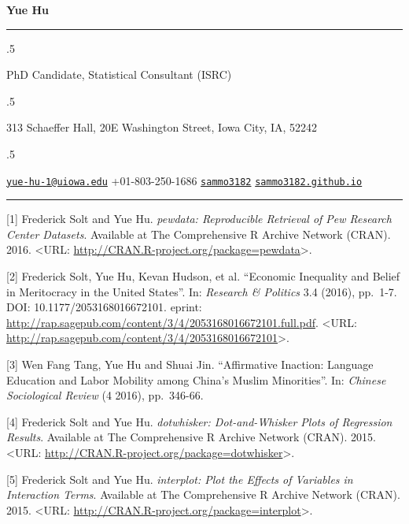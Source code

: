 \documentclass[10.5pt,]{article}
\begin{document}
\centerline{\huge \bf Yue Hu}

\vspace{2 mm}

\hrule

\vspace{2 mm}

\moveleft.5\hoffset\centerline{PhD Candidate, Statistical Consultant (ISRC)}
\moveleft.5\hoffset\centerline{313 Schaeffer Hall, 20E Washington Street, Iowa City, IA, 52242}
\moveleft.5\hoffset\centerline{ \faEnvelopeO \hspace{1 mm} \href{mailto:}{\tt \href{mailto:yue-hu-1@uiowa.edu}{\nolinkurl{yue-hu-1@uiowa.edu}}} \hspace{1 mm}  \faPhone \hspace{1 mm}  +01-803-250-1686  \hspace{1 mm}  \faGithub \hspace{1 mm} \href{http://github.com/sammo3182}{\tt sammo3182} \hspace{1 mm}    \faGlobe \hspace{1 mm} \href{http://sammo3182.github.io}{\tt sammo3182.github.io}   }

\vspace{2 mm}

\hrule


{[}1{]} Frederick Solt and Yue Hu. \emph{pewdata: Reproducible Retrieval
of Pew Research Center Datasets}. Available at The Comprehensive R
Archive Network (CRAN). 2016. \textless{}URL:
\url{http://CRAN.R-project.org/package=pewdata}\textgreater{}.

{[}2{]} Frederick Solt, Yue Hu, Kevan Hudson, et al. ``Economic
Inequality and Belief in Meritocracy in the United States''. In:
\emph{Research \& Politics} 3.4 (2016), pp.~1-7. DOI:
10.1177/2053168016672101. eprint:
\url{http://rap.sagepub.com/content/3/4/2053168016672101.full.pdf}.
\textless{}URL:
\url{http://rap.sagepub.com/content/3/4/2053168016672101}\textgreater{}.

{[}3{]} Wen Fang Tang, Yue Hu and Shuai Jin. ``Affirmative Inaction:
Language Education and Labor Mobility among China's Muslim Minorities''.
In: \emph{Chinese Sociological Review} (4 2016), pp.~346-66.

{[}4{]} Frederick Solt and Yue Hu. \emph{dotwhisker: Dot-and-Whisker
Plots of Regression Results}. Available at The Comprehensive R Archive
Network (CRAN). 2015. \textless{}URL:
\url{http://CRAN.R-project.org/package=dotwhisker}\textgreater{}.

{[}5{]} Frederick Solt and Yue Hu. \emph{interplot: Plot the Effects of
Variables in Interaction Terms}. Available at The Comprehensive R
Archive Network (CRAN). 2015. \textless{}URL:
\url{http://CRAN.R-project.org/package=interplot}\textgreater{}.
\end{document}
